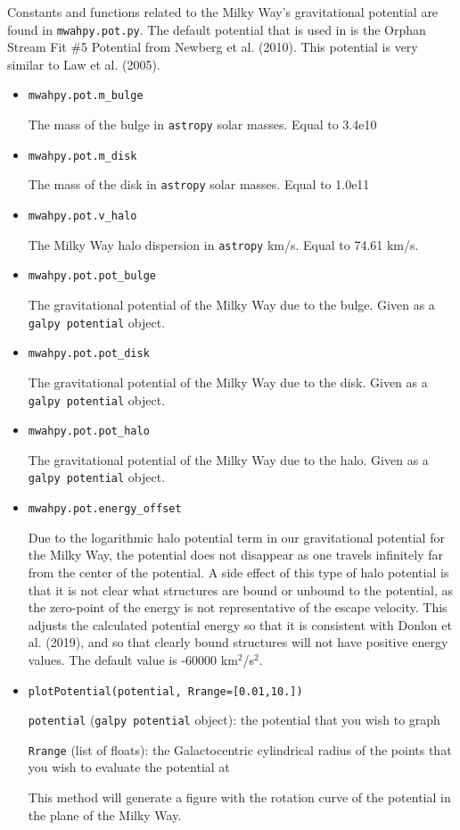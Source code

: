 \documentclass{article}
\begin{document}
Constants and functions related to the Milky Way's gravitational potential are found in \verb!mwahpy.pot.py!. The default potential that is used in \mwahpy is the Orphan Stream Fit \#5 Potential from Newberg et al. (2010). This potential is very similar to Law et al. (2005). 

\begin{itemize}

\item \verb!mwahpy.pot.m_bulge!

The mass of the bulge in \verb!astropy! solar masses. Equal to 3.4e10 \msol

\item \verb!mwahpy.pot.m_disk!

The mass of the disk in \verb!astropy! solar masses. Equal to 1.0e11 \msol

\item \verb!mwahpy.pot.v_halo!

The Milky Way halo dispersion in \verb!astropy! km/s. Equal to 74.61 km/s.

\item \verb!mwahpy.pot.pot_bulge!

The gravitational potential of the Milky Way due to the bulge. Given as a \verb!galpy potential! object. 

\item \verb!mwahpy.pot.pot_disk!

The gravitational potential of the Milky Way due to the disk. Given as a \verb!galpy potential! object. 

\item \verb!mwahpy.pot.pot_halo!

The gravitational potential of the Milky Way due to the halo. Given as a \verb!galpy potential! object. 

\item \verb!mwahpy.pot.energy_offset!

Due to the logarithmic halo potential term in our gravitational potential for the Milky Way, the potential does not disappear as one travels infinitely far from the center of the potential. A side effect of this type of halo potential is that it is not clear what structures are bound or unbound to the potential, as the zero-point of the energy is not representative of the escape velocity. This adjusts the calculated potential energy so that it is consistent with Donlon et al. (2019), and so that clearly bound structures will not have positive energy values. The default value is -60000 km$^2$/s$^2$. 

\item \verb!plotPotential(potential, Rrange=[0.01,10.])!
  
\verb!potential! (\verb!galpy potential! object): the potential that you wish to graph 

\verb!Rrange! (list of floats): the Galactocentric cylindrical radius of the points that you wish to evaluate the potential at

This method will generate a figure with the rotation curve of the potential in the plane of the Milky Way. 

\end{itemize}
\end{document}
